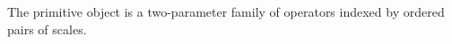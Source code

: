 %
%
%

The primitive object is a two-parameter family of operators indexed by ordered pairs of
scales.

